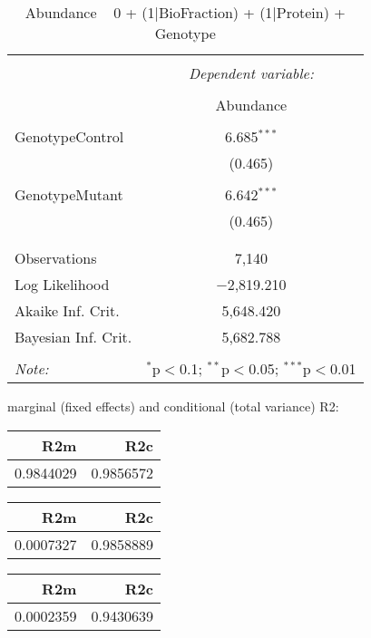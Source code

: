 \documentclass[11pt]{report}
\begin{document}
\begin{table}[!htbp] \centering 
  \caption{Abundance ~ 0 + (1|BioFraction) + (1|Protein) + Genotype} 
  \label{} 
\begin{tabular}{@{\extracolsep{5pt}}lc} 
\\[-1.8ex]\hline 
\hline \\[-1.8ex] 
 & \multicolumn{1}{c}{\textit{Dependent variable:}} \\ 
\cline{2-2} 
\\[-1.8ex] & Abundance \\ 
\hline \\[-1.8ex] 
 GenotypeControl & 6.685$^{***}$ \\ 
  & (0.465) \\ 
  & \\ 
 GenotypeMutant & 6.642$^{***}$ \\ 
  & (0.465) \\ 
  & \\ 
\hline \\[-1.8ex] 
Observations & 7,140 \\ 
Log Likelihood & $-$2,819.210 \\ 
Akaike Inf. Crit. & 5,648.420 \\ 
Bayesian Inf. Crit. & 5,682.788 \\ 
\hline 
\hline \\[-1.8ex] 
\textit{Note:}  & \multicolumn{1}{r}{$^{*}$p$<$0.1; $^{**}$p$<$0.05; $^{***}$p$<$0.01} \\ 
\end{tabular} 
\end{table} 
marginal (fixed effects) and conditional (total variance) R2:

\begin{tabular}{r|r}
\hline
R2m & R2c\\
\hline
0.9844029 & 0.9856572\\
\hline
\end{tabular}

\begin{tabular}{r|r}
\hline
R2m & R2c\\
\hline
0.0007327 & 0.9858889\\
\hline
\end{tabular}

\begin{tabular}{r|r}
\hline
R2m & R2c\\
\hline
0.0002359 & 0.9430639\\
\hline
\end{tabular}
\end{document}

